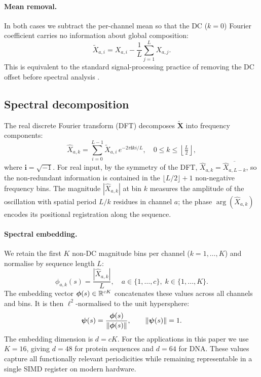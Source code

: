 \paragraph{Mean removal.}
In both cases we subtract the per-channel mean so that the DC ($k=0$) Fourier
coefficient carries no information about global composition:
\begin{equation}
  \widetilde{X}_{a,i} = X_{a,i} - \frac{1}{L}\sum_{j=1}^{L} X_{a,j}.
  \label{im:eq:mean_removal}
\end{equation}
This is equivalent to the standard signal-processing practice of removing the
DC offset before spectral analysis \citep{oppenheim2009}.

\subsection{Spectral decomposition}
\label{im:sec:spectral_decomp}

The real discrete Fourier transform (DFT) decomposes
$\widetilde{\mathbf{X}}$ into frequency components:
\begin{equation}
  \widehat{X}_{a,k}
  = \sum_{i=0}^{L-1} \widetilde{X}_{a,i}\,
    e^{-2\pi \mathbf{i} k i / L},
  \quad 0 \leq k \leq \left\lfloor \tfrac{L}{2} \right\rfloor,
  \label{im:eq:dft}
\end{equation}
where $\mathbf{i} = \sqrt{-1}$. For real input, by the symmetry of the DFT,
$\widehat{X}_{a,k} = \overline{\widehat{X}_{a,L-k}}$, so the non-redundant
information is contained in the $\lfloor L/2 \rfloor + 1$ non-negative
frequency bins. The magnitude $|\widehat{X}_{a,k}|$ at bin $k$ measures the
amplitude of the oscillation with spatial period $L/k$ residues in channel
$a$; the phase $\arg(\widehat{X}_{a,k})$ encodes its positional registration
along the sequence.

\paragraph{Spectral embedding.}
We retain the first $K$ non-DC magnitude bins per channel
($k = 1, \ldots, K$) and normalise by sequence length $L$:
\begin{equation}
  \phi_{a,k}(s) = \frac{|\widehat{X}_{a,k}|}{L},
  \quad a \in \{1,\ldots,c\},\; k \in \{1,\ldots,K\}.
  \label{im:eq:spectral_embed}
\end{equation}
The embedding vector $\bm{\phi}(s) \in \mathbb{R}^{cK}$ concatenates these values
across all channels and bins. It is then $\ell^2$-normalised to the unit
hypersphere:
\begin{equation}
  \bm{\psi}(s) = \frac{\bm{\phi}(s)}{\norm{\bm{\phi}(s)}},
  \qquad \norm{\bm{\psi}(s)} = 1.
  \label{im:eq:l2norm}
\end{equation}
The embedding dimension is $d = cK$. For the applications in this paper we use
$K = 16$, giving $d = 48$ for protein sequences and $d = 64$ for DNA. These
values capture all functionally relevant periodicities while remaining
representable in a single SIMD register on modern hardware.

